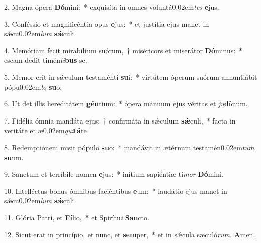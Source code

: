 \item 2. Magna ópera \textbf{Dó}mini:~* exquisíta in omnes voluntá\kern0.02em\textit{tes} \textbf{e}jus.
\item 3. Conféssio et magnificéntia opus \textbf{e}jus:~* et justítia ejus manet in sǽcu\kern0.02em\textit{lum} \textbf{sǽ}culi.
\item 4. Memóriam fecit mirabílium suórum,~† miséricors et miserátor \textbf{Dó}minus:~* escam dedit timén\textit{ti}\textbf{bus} se.
\item 5. Memor erit in sǽculum testaménti \textbf{su}i:~* virtútem óperum suórum annuntiábit pópu\kern0.02em\textit{lo} \textbf{su}o:
\item 6. Ut det illis hereditátem \textbf{gén}tium:~* ópera mánuum ejus véritas et \textit{ju}\textbf{dí}cium.
\item 7. Fidélia ómnia mandáta ejus:~† confirmáta in sǽculum \textbf{sǽ}culi,~* facta in veritáte et æ\kern0.02em\textit{qui}\textbf{tá}te.
\item 8. Redemptiónem misit pópulo \textbf{su}o:~* mandávit in ætérnum testamén\kern0.02em\textit{tum} \textbf{su}um.
\item 9. Sanctum et terríbile nomen \textbf{e}jus:~* inítium sapiéntiæ ti\textit{mor} \textbf{Dó}mini.
\item 10. Intelléctus bonus ómnibus faciéntibus \textbf{e}um:~* laudátio ejus manet in sǽcu\kern0.02em\textit{lum} \textbf{sǽ}culi.
\item 11. Glória Patri, et \textbf{Fí}lio,~* et Spirítu\textit{i} \textbf{San}cto.
\item 12. Sicut erat in princípio, et nunc, et \textbf{sem}per,~* et in sǽcula sæculó\textit{rum}. \textbf{A}men.


